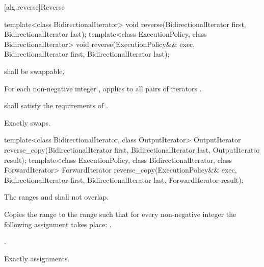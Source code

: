 [alg.reverse]{Reverse}

%
\begin{itemdecl}
template<class BidirectionalIterator>
  void reverse(BidirectionalIterator first, BidirectionalIterator last);
template<class ExecutionPolicy, class BidirectionalIterator>
  void reverse(ExecutionPolicy&& exec,
               BidirectionalIterator first, BidirectionalIterator last);
\end{itemdecl}

\begin{itemdescr}
\pnum
\requires
{} shall be swappable.

\pnum
\effects
For each non-negative integer
,
applies
to all pairs of iterators
.

\pnum
\requires
{} shall satisfy the requirements of
.

\pnum
\complexity
Exactly
swaps.
\end{itemdescr}

%
\begin{itemdecl}
template<class BidirectionalIterator, class OutputIterator>
  OutputIterator
    reverse_copy(BidirectionalIterator first, BidirectionalIterator last,
                 OutputIterator result);
template<class ExecutionPolicy, class BidirectionalIterator, class ForwardIterator>
  ForwardIterator
    reverse_copy(ExecutionPolicy&& exec,
                 BidirectionalIterator first, BidirectionalIterator last,
                 ForwardIterator result);
\end{itemdecl}

\begin{itemdescr}
\pnum
\requires
The ranges
and
shall not overlap.

\pnum
\effects
Copies the range
to the range
such that
for every non-negative integer
the following assignment takes place:
.

\pnum
\returns
{}.

\pnum
\complexity
Exactly
assignments.
\end{itemdescr}

